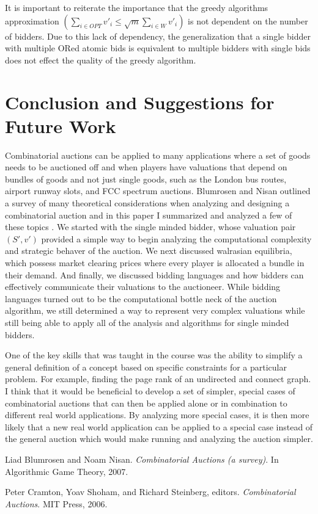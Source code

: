 \documentclass[10pt,onecolumn,letterpaper]{article}
\theoremstyle{definition}
\begin{document}
It is important to reiterate the importance that the greedy algorithms approximation $(\sum_{i \in OPT} v'_i \leq \sqrt{m} \sum_{i \in W} v'_i)$ is not dependent on the number of bidders. Due to this lack of dependency, the generalization that a single bidder with multiple ORed atomic bids is equivalent to multiple bidders with single bids does not effect the quality of the greedy algorithm.

\section{Conclusion and Suggestions for Future Work} %

Combinatorial auctions can be applied to many applications where a set of goods needs to be auctioned off and when players have valuations that depend on bundles of goods and not just single goods, such as the London bus routes, airport runway slots, and FCC spectrum auctions. Blumrosen and Nisan outlined a survey of many theoretical considerations when analyzing and designing a combinatorial auction and in this paper I summarized and analyzed a few of these topics \cite{paper}. We started with the single minded bidder, whose valuation pair $(S',v')$ provided a simple way to begin analyzing the computational complexity and strategic behaver of the auction. We next discussed walrasian equilibria, which possess market clearing prices where every player is allocated a bundle in their demand. And finally, we discussed bidding languages and how bidders can effectively communicate their valuations to the auctioneer. While bidding languages turned out to be the computational bottle neck of the auction algorithm, we still determined a way to represent very complex valuations while still being able to apply all of the analysis and algorithms for single minded bidders.

One of the key skills that was taught in the course was the ability to simplify a general definition of a concept based on specific constraints for a particular problem. For example, finding the page rank of an undirected and connect graph. I think that it would be beneficial to develop a set of simpler, special cases of combinatorial auctions that can then be applied alone or in combination to different real world applications. By analyzing more special cases, it is then more likely that a new real world application can be applied to a special case instead of the general auction which would make running and analyzing the auction simpler.

\begin{thebibliography}{0} %

Liad Blumrosen and Noam Nisan. 
\textit{Combinatorial Auctions (a survey)}. 
In Algorithmic Game Theory, 2007.
 
Peter Cramton, Yoav Shoham, and Richard Steinberg, editors.
\textit{Combinatorial Auctions}. 
MIT Press, 2006.
 
\end{thebibliography}
\end{document}
